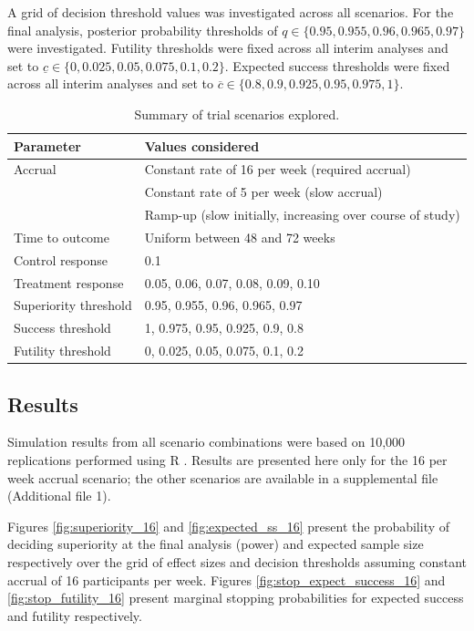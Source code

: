 \documentclass{bmcart}
\begin{document}
A grid of decision threshold values was investigated across all scenarios.
For the final analysis, posterior probability thresholds of $q\in\{0.95,0.955,0.96,0.965,0.97\}$ were investigated.
Futility thresholds were fixed across all interim analyses and set to $\underline{c}\in\{0,0.025,0.05,0.075,0.1,0.2\}$.
Expected success thresholds were fixed across all interim analyses and set to $\overline{c}\in\{0.8,0.9,0.925,0.95,0.975,1\}$.

\begin{table}[!ht]
	\caption{Summary of trial scenarios explored.}
	\label{tab:scenarios}
	\begin{tabular}{ll}
		Parameter & Values considered \\ \hline
		Accrual & Constant rate of 16 per week (required accrual) \\
		& Constant rate of 5 per week (slow accrual) \\
		& Ramp-up (slow initially, increasing over course of study) \\
		Time to outcome & Uniform between 48 and 72 weeks \\
		Control response & 0.1 \\
		Treatment response & 0.05, 0.06, 0.07, 0.08, 0.09, 0.10 \\
		Superiority threshold & 0.95, 0.955, 0.96, 0.965, 0.97 \\
		Success threshold & 1, 0.975, 0.95, 0.925, 0.9, 0.8 \\
		Futility threshold & 0, 0.025, 0.05, 0.075, 0.1, 0.2 \\
		\hline
	\end{tabular}
\end{table}

\subsection*{Results}

Simulation results from all scenario combinations were based on 10,000 replications performed using R \cite{Rlang}.
Results are presented here only for the 16 per week accrual scenario; the other scenarios are available in a supplemental file (Additional file 1).

Figures \ref{fig:superiority_16} and \ref{fig:expected_ss_16} present the probability of deciding superiority at the final analysis (power) and expected sample size respectively over the grid of effect sizes and decision thresholds assuming constant accrual of 16 participants per week.
Figures \ref{fig:stop_expect_success_16} and \ref{fig:stop_futility_16} present marginal stopping probabilities for expected success and futility respectively.
\end{document}

